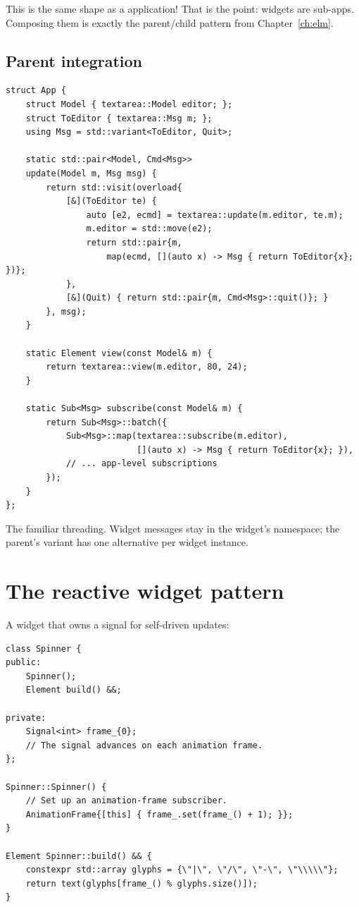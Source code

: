 This is the same shape as a \maya{} application! That is the
point: widgets are sub-apps. Composing them is exactly the
parent/child pattern from Chapter~\ref{ch:elm}.

\subsection*{Parent integration}

\begin{lstlisting}
struct App {
    struct Model { textarea::Model editor; };
    struct ToEditor { textarea::Msg m; };
    using Msg = std::variant<ToEditor, Quit>;

    static std::pair<Model, Cmd<Msg>>
    update(Model m, Msg msg) {
        return std::visit(overload{
            [&](ToEditor te) {
                auto [e2, ecmd] = textarea::update(m.editor, te.m);
                m.editor = std::move(e2);
                return std::pair{m,
                    map(ecmd, [](auto x) -> Msg { return ToEditor{x}; })};
            },
            [&](Quit) { return std::pair{m, Cmd<Msg>::quit()}; }
        }, msg);
    }

    static Element view(const Model& m) {
        return textarea::view(m.editor, 80, 24);
    }

    static Sub<Msg> subscribe(const Model& m) {
        return Sub<Msg>::batch({
            Sub<Msg>::map(textarea::subscribe(m.editor),
                          [](auto x) -> Msg { return ToEditor{x}; }),
            // ... app-level subscriptions
        });
    }
};
\end{lstlisting}

The familiar  threading. Widget messages stay in the
widget's namespace; the parent's  variant has one
alternative per widget instance.

\section{The reactive widget pattern}

A widget that owns a signal for self-driven updates:

\begin{lstlisting}
class Spinner {
public:
    Spinner();
    Element build() &&;

private:
    Signal<int> frame_{0};
    // The signal advances on each animation frame.
};

Spinner::Spinner() {
    // Set up an animation-frame subscriber.
    AnimationFrame{[this] { frame_.set(frame_() + 1); }};
}

Element Spinner::build() && {
    constexpr std::array glyphs = {\"|\", \"/\", \"-\", \"\\\\\"};
    return text(glyphs[frame_() % glyphs.size()]);
}
\end{lstlisting}


